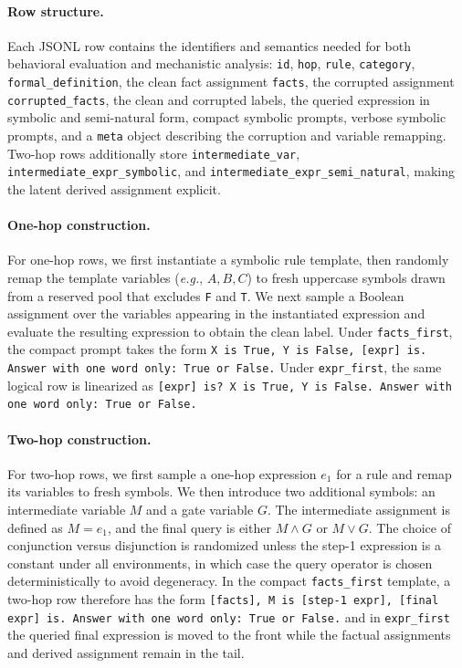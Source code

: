 \documentclass[11pt]{article}
\begin{document}
\paragraph{Row structure.}
Each JSONL row contains the identifiers and semantics needed for both behavioral evaluation and mechanistic analysis: \texttt{id}, \texttt{hop}, \texttt{rule}, \texttt{category}, \texttt{formal\_definition}, the clean fact assignment \texttt{facts}, the corrupted assignment \texttt{corrupted\_facts}, the clean and corrupted labels, the queried expression in symbolic and semi-natural form, compact symbolic prompts, verbose symbolic prompts, and a \texttt{meta} object describing the corruption and variable remapping. Two-hop rows additionally store \texttt{intermediate\_var}, \texttt{intermediate\_expr\_symbolic}, and \texttt{intermediate\_expr\_semi\_natural}, making the latent derived assignment explicit.

\paragraph{One-hop construction.}
For one-hop rows, we first instantiate a symbolic rule template, then randomly remap the template variables (\textit{e.g.}, $A,B,C$) to fresh uppercase symbols drawn from a reserved pool that excludes \texttt{F} and \texttt{T}. We next sample a Boolean assignment over the variables appearing in the instantiated expression and evaluate the resulting expression to obtain the clean label. Under \texttt{facts\_first}, the compact prompt takes the form
\texttt{X is True, Y is False, [expr] is. Answer with one word only: True or False.}
Under \texttt{expr\_first}, the same logical row is linearized as
\texttt{[expr] is? X is True, Y is False. Answer with one word only: True or False.}

\paragraph{Two-hop construction.}
For two-hop rows, we first sample a one-hop expression $e_{1}$ for a rule and remap its variables to fresh symbols. We then introduce two additional symbols: an intermediate variable $M$ and a gate variable $G$. The intermediate assignment is defined as $M = e_{1}$, and the final query is either $M \land G$ or $M \lor G$. The choice of conjunction versus disjunction is randomized unless the step-1 expression is a constant under all environments, in which case the query operator is chosen deterministically to avoid degeneracy. In the compact \texttt{facts\_first} template, a two-hop row therefore has the form
\texttt{[facts], M is [step-1 expr], [final expr] is. Answer with one word only: True or False.}
and in \texttt{expr\_first} the queried final expression is moved to the front while the factual assignments and derived assignment remain in the tail.
\end{document}
